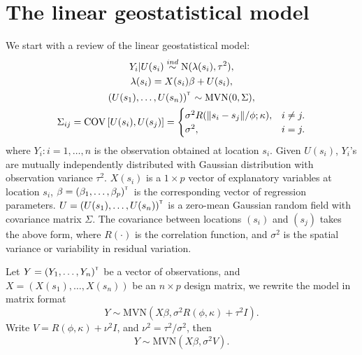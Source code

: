 \documentclass{article}\usepackage[]{graphicx}\usepackage[]{color}
\def\N{{\mathrm{N}}}
\def\MVN{{\mathrm{MVN}}}
\def\cov{{\mathrm{COV}}}
\def\T{{\footnotesize {^{_{\sf T}}}}}
\begin{document}
\section{The linear geostatistical model}
\label{section1}
We start with a review of the linear geostatistical model:
%
\begin{gather*}
Y_{i}|U(s_i) \overset{ind}\sim \N(\lambda(s_{i}),\tau^2 ),\\
\lambda(s_{i})=X(s_i)\beta+U(s_{i}),\\
(U(s_1), \dots,U(s_n))^\T \sim \MVN (0,\Sigma),\\
\Sigma_{ij}=\cov \left[U(s_i), U(s_j)\right]=\begin{cases} 
\sigma^2 R(\|s_i-s_j\|/\phi;\kappa),& i\neq j .\\
\sigma^2, & i=j.
\end{cases}
\end{gather*}
%
where
$Y_i: i=1,\dots,n$ is the observation obtained at location $s_i$. 
Given $U(s_i)$, $Y_i$'s are mutually independently distributed with Gaussian distribution with observation variance $\tau^2$.  
$X(s_i)$ is a $1 \times p$ vector of explanatory variables at location $s_i$, 
$\beta=(\beta_1,\dots,\beta_p)^\T$ is the corresponding vector of regression parameters. 
$U=(U(s_1), \dots,U(s_n))^\T $ is a zero-mean Gaussian random field with covariance matrix $\Sigma$. The covariance between locations $(s_i)$ and $(s_j)$ takes the above form, where $R(\cdot)$ is the correlation function, and $\sigma^2$ is the spatial variance or variability in residual variation.  

Let $Y=(Y_1,\dots,Y_n)^\T$ be a vector of observations, and $X = (X(s_1), \dots, X(s_n))$ be an $n \times p$ design matrix, we rewrite the model in matrix format
%
\begin{equation*} 
Y \sim \MVN (X\beta, \sigma^2 R(\phi,\kappa)+\tau^2I).
\end{equation*}
% 
Write $V=R(\phi,\kappa)+\nu^2I$, and $\nu^2={\tau^2}/{\sigma^2}$, then
\begin{equation} \label{eq:1}
Y \sim \MVN (X\beta, \sigma^2 V).
\end{equation}
\end{document}
